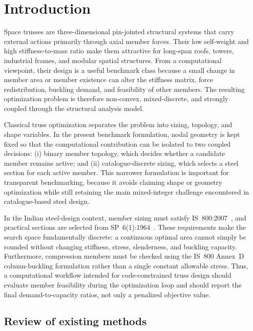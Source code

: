 \documentclass[lineno,pdflatex,sn-mathphys-num]{sn-jnl}
\begin{document}
\section{Introduction}
\label{sec:intro}

Space trusses are three-dimensional pin-jointed structural systems that
carry external actions primarily through axial member forces. Their low
self-weight and high stiffness-to-mass ratio make them attractive for
long-span roofs, towers, industrial frames, and modular spatial structures.
From a computational viewpoint, their design is a useful benchmark class
because a small change in member area or member existence can alter the
stiffness matrix, force redistribution, buckling demand, and feasibility of
other members. The resulting optimization problem is therefore non-convex,
mixed-discrete, and strongly coupled through the structural analysis model.

Classical truss optimization separates the problem into sizing, topology,
and shape variables. In the present benchmark formulation, nodal geometry is
kept fixed so that the computational contribution can be isolated to two
coupled decisions: (i) binary member topology, which decides whether a
candidate member remains active; and (ii) catalogue-discrete sizing, which
selects a steel section for each active member. This narrower formulation is
important for transparent benchmarking, because it avoids claiming shape or
geometry optimization while still retaining the main mixed-integer challenge
encountered in catalogue-based steel design.

In the Indian steel-design context, member sizing must satisfy
IS~800:2007~\citep{IS800}, and practical sections are selected from
SP~6(1):1964~\citep{SP61}. These requirements make the search space
fundamentally discrete: a continuous optimal area cannot simply be rounded
without changing stiffness, stress, slenderness, and buckling capacity.
Furthermore, compression members must be checked using the IS~800 Annex~D
column-buckling formulation rather than a single constant allowable stress.
Thus, a computational workflow intended for code-constrained truss design
should evaluate member feasibility during the optimization loop and should
report the final demand-to-capacity ratios, not only a penalized objective
value.

\subsection{Review of existing methods}
\end{document}
